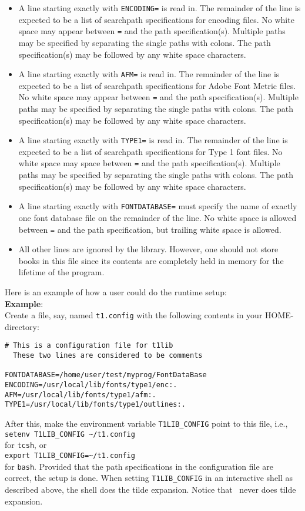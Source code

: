 \begin{itemize}
\item A line starting exactly with \verb+ENCODING=+ is read in. The
  remainder of the line is expected to be a list of searchpath
  specifications for encoding files. No white space may appear
  between \verb+=+ and the path specification(s).
  Multiple paths may be specified by separating
  the single paths with colons. The path specification(s) may be
  followed by any white space characters.
\item A line starting exactly with \verb+AFM=+ is read in. The
  remainder of the line is expected to be a list of searchpath
  specifications for Adobe Font Metric files. No white space may
  appear 
  between \verb+=+ and the path specification(s). 
  Multiple paths may be specified by separating 
  the single paths with colons. The path specification(s) may be
  followed by any white space characters.
\item A line starting exactly with \verb+TYPE1=+ is read in. The
  remainder of the line is expected to be a list of searchpath
  specifications for Type 1 font files. No white space may
  space between \verb+=+ and the path specification(s). 
  Multiple paths may be specified by separating
  the single paths with colons. The path specification(s) may be
  followed by any white space characters.
\item A line starting exactly with \verb+FONTDATABASE=+ must
  specify the name of exactly one font database file on the remainder
  of the line.
  No white space is allowed between \verb+=+ and the path
  specification, but trailing white space is allowed.
\item All other lines are ignored by the library. However, one should
  not store books in this file since its contents are 
  completely held in memory for the lifetime of the program.
\end{itemize}

Here is an example of how a user could do the runtime setup: \\[2mm]
{\bfseries Example}: \\
Create a file, say, named \verb+t1.config+ with the following
contents in your HOME-directory:
\begin{verbatim}
# This is a configuration file for t1lib
  These two lines are considered to be comments

FONTDATABASE=/home/user/test/myprog/FontDataBase
ENCODING=/usr/local/lib/fonts/type1/enc:.
AFM=/usr/local/lib/fonts/type1/afm:.
TYPE1=/usr/local/lib/fonts/type1/outlines:.
\end{verbatim}
After this, make the environment variable \verb+T1LIB_CONFIG+  point
to this file, i.e., \\
\verb+setenv T1LIB_CONFIG ~/t1.config+\\
 for \verb+tcsh+, or\\ 
\verb+export T1LIB_CONFIG=~/t1.config+\\
for \verb+bash+. Provided that the path specifications in the
configuration file are correct, the setup is done. When setting
\verb+T1LIB_CONFIG+ in an interactive shell as described above, the shell does
the tilde expansion. Notice that \tonelib\ never does tilde expansion.


